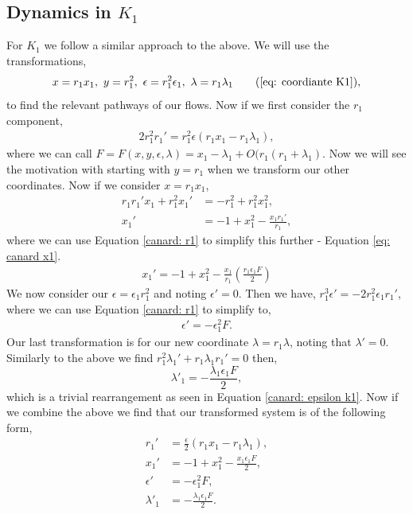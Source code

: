 \subsection{Dynamics in \texorpdfstring{$K_1$}{K1}}
For $K_1$ we follow a similar approach to the above. We will use the transformations, 
\begin{equation}
x=r_1x_1, \ y=r_1^2, \ \epsilon=r_1^2\epsilon_1, \ \lambda=r_1\lambda_1 \tag{\ref{eq: coordiante K1}},
\end{equation}
to find the relevant pathways of our flows. Now if we first consider the $r_1$ component, 
\begin{align}
2r_1^2r_1'=r_1^2\epsilon(r_1x_1-r_1\lambda_1), \label{canard: r1}
\end{align}
where we can call $F=F(x,y,\epsilon,\lambda)=x_1-\lambda_1+O(r_1(r_1+\lambda_1)$. Now we will see the motivation with starting with $y=r_1$ when we transform our other coordinates. Now if we consider $x=r_1x_1$,
\begin{align*}
r_1r_1'x_1+r_1^2x_1'&=-r_1^2+r_1^2x_1^2,\\
x_1'&=-1+x_1^2-\frac{x_1r_1'}{r_1},
\end{align*}
where we can use Equation \ref{canard: r1} to simplify this further - Equation \ref{eq: canard x1}.
\begin{align}
x_1'=-1+x_1^2-\frac{x_1}{r_1}\left(\frac{r_1\epsilon_1F}{2}\right) \label{eq: canard x1}
\end{align}
We now consider our $\epsilon=\epsilon_1r_1^2$ and noting $\epsilon'=0$. Then we have, $r_1^3\epsilon'=-2r_1^2\epsilon_1r_1'$, where we can use Equation \ref{canard: r1} to simplify to,
\begin{align}
\epsilon'=-\epsilon_1^2F. \label{canard: epsilon k1}
\end{align}
Our last transformation is for our new coordinate $\lambda=r_1\lambda$, noting that $\lambda'=0$. Similarly to the above we find $r_1^2\lambda_1'+r_1\lambda_1r_1'=0$ then, 
\begin{equation}
\lambda'_1=-\frac{\lambda_1\epsilon_1F}{2}, 
\end{equation}
which is a trivial rearrangement as seen in Equation \ref{canard: epsilon k1}. Now if we combine the above we find that our transformed system is of the following form,
\begin{subequations}
	\begin{align}
	r_1'&=\frac{\epsilon}{2}(r_1x_1-r_1\lambda_1), \\
	x_1'&=-1+x_1^2-\frac{x_1\epsilon_1F}{2},\\
	\epsilon'&=-\epsilon_1^2F,\\
	\lambda'_1&=-\frac{\lambda_1\epsilon_1F}{2}.
	\end{align}
	\label{canard: system of equations}
\end{subequations}
